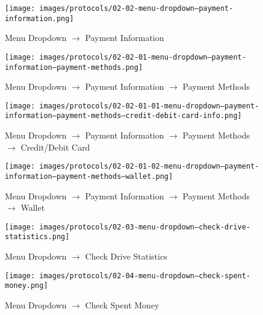 \documentclass[a4paper, 12pt]{article}
\begin{document}
\begin{figure} [htbp]
  \begin{center}
    \texttt{[image: images/protocols/02-02-menu-dropdown--payment-information.png]}
  \end{center}
  \caption{Menu Dropdown $\rightarrow$ Payment Information}
\end{figure}

\begin{figure} [htbp]
  \begin{center}
    \texttt{[image: images/protocols/02-02-01-menu-dropdown--payment-information--payment-methods.png]}
  \end{center}
  \caption{Menu Dropdown $\rightarrow$ Payment Information $\rightarrow$ Payment Methods}
\end{figure}

\begin{figure} [htbp]
  \begin{center}
    \texttt{[image: images/protocols/02-02-01-01-menu-dropdown--payment-information--payment-methods--credit-debit-card-info.png]}
  \end{center}
  \caption{Menu Dropdown $\rightarrow$ Payment Information $\rightarrow$ Payment Methods $\rightarrow$ Credit/Debit Card}
\end{figure}

\begin{figure} [htbp]
  \begin{center}
    \texttt{[image: images/protocols/02-02-01-02-menu-dropdown--payment-information--payment-methods--wallet.png]}
  \end{center}
  \caption{Menu Dropdown $\rightarrow$ Payment Information $\rightarrow$ Payment Methods $\rightarrow$ Wallet}
\end{figure}

\begin{figure} [htbp]
  \begin{center}
    \texttt{[image: images/protocols/02-03-menu-dropdown--check-drive-statistics.png]}
  \end{center}
  \caption{Menu Dropdown $\rightarrow$ Check Drive Statistics}
\end{figure}

\begin{figure} [htbp]
  \begin{center}
    \texttt{[image: images/protocols/02-04-menu-dropdown--check-spent-money.png]}
  \end{center}
  \caption{Menu Dropdown $\rightarrow$ Check Spent Money}
\end{figure}
\end{document}

